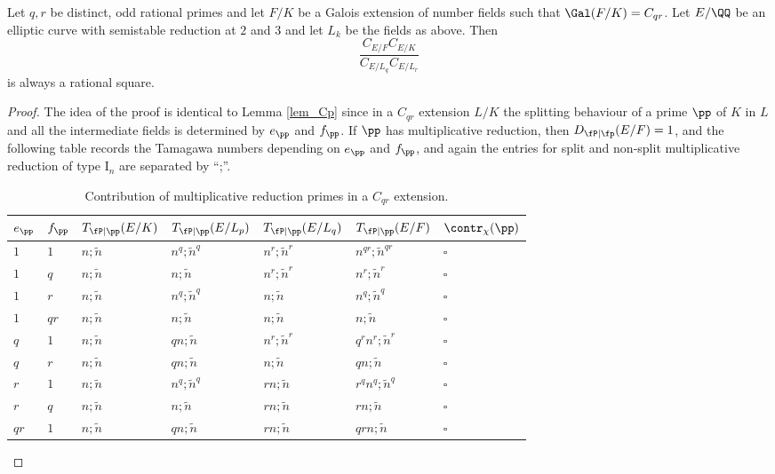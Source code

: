 \begin{lemma}\label{lem_Cpq}
    Let $q,r$ be distinct, odd rational primes and let $F/K$ be a Galois extension of number fields such that $\Gal(F/K)=C_{qr}$. Let $E/\QQ$ be an elliptic curve with semistable reduction at $2$ and $3$ and let $L_k$ be the fields as above. Then
    $$\frac{C_{E/F}C_{E/K}}{C_{E/L_q}C_{E/L_r}}$$
    is always a rational square.
\end{lemma}

\begin{proof}
    The idea of the proof is identical to Lemma \ref{lem_Cp} since in a $C_{qr}$ extension $L/K$ the splitting behaviour of a prime $\pp$ of $K$ in $L$ and all the intermediate fields is determined by $e_\pp$ and $f_\pp$. If $\pp$ has multiplicative reduction, then $D_{\fP\mid\fp}(E/F)=1$, and the following table records the Tamagawa numbers depending on $e_\pp$ and $f_\pp$, and again the entries for split and non-split multiplicative reduction of type $\mathrm{I}_n$ are separated by ``;''.

    \begin{table}[!ht]
        \centering
        \begin{tabular}{|l|l|l|l|l|l|l|}
        \hline
        $e_\pp$ & $f_\pp$  & $T_{\fP\mid \pp}(E/K)$ & $T_{\fP\mid \pp}(E/L_p)$ & $T_{\fP\mid \pp}(E/L_q)$ & $T_{\fP\mid \pp}(E/F)$ & $\contr_\chi(\pp)$ \\ \hline
        $1$ & $1$ & $n;\tilde{n}$ & $n^q;\tilde{n}^q$ & $n^r;\tilde{n}^r$ & $n^{qr};\tilde{n}^{qr}$ & $\square$ \\ \hline
        $1$ & $q$ & $n;\tilde{n}$ & $n;\tilde{n}$ & $n^r;\tilde{n}^r$ & $n^r;\tilde{n}^r$ & $\square$ \\ \hline
        $1$ & $r$ & $n;\tilde{n}$ & $n^q;\tilde{n}^q$ & $n;\tilde{n}$ & $n^q;\tilde{n}^q$ & $\square$ \\ \hline
        $1$ & $qr$ & $n;\tilde{n}$ & $n;\tilde{n}$ & $n;\tilde{n}$ & $n;\tilde{n}$ & $\square$ \\ \hline
        $q$ & $1$ & $n;\tilde{n}$ & $qn;\tilde{n}$ & $n^r;\tilde{n}^r$ & $q^rn^r;\tilde{n}^r$ & $\square$ \\ \hline
        $q$ & $r$ & $n;\tilde{n}$ & $qn;\tilde{n}$ & $n;\tilde{n}$ & $qn;\tilde{n}$ & $\square$ \\ \hline
        $r$ & $1$ & $n;\tilde{n}$ & $n^q;\tilde{n}^q$ & $rn;\tilde{n}$ & $r^qn^q;\tilde{n}^q$ & $\square$ \\ \hline
        $r$ & $q$ & $n;\tilde{n}$ & $n;\tilde{n}$ & $rn;\tilde{n}$ & $rn;\tilde{n}$ & $\square$ \\ \hline
        $qr$ & $1$ & $n;\tilde{n}$ & $qn;\tilde{n}$ & $rn;\tilde{n}$ & $qrn;\tilde{n}$ & $\square$ \\ \hline
        \end{tabular}
        \caption{Contribution of multiplicative reduction primes in a $C_{qr}$ extension.}
    \end{table}


\end{proof}

